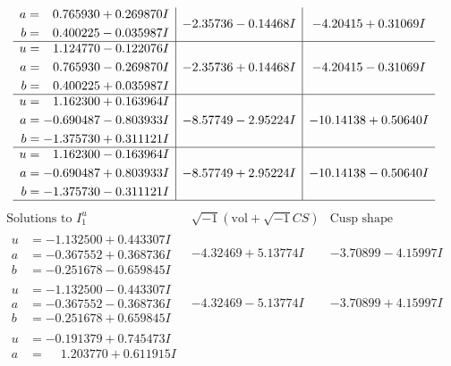\documentclass[1p]{elsarticle_modified}
\theoremstyle{definition}
\newcommand{\I}{\sqrt{-1}}
\begin{document}
$$\begin{array}{c|c|c}
\begin{aligned}
a &= \phantom{-}0.765930 + 0.269870 I \\
b &= \phantom{-}0.400225 - 0.035987 I\end{aligned}
 & -2.35736 - 0.14468 I & -4.20415 + 0.31069 I \\ \hline\begin{aligned}
u &= \phantom{-}1.124770 - 0.122076 I \\
a &= \phantom{-}0.765930 - 0.269870 I \\
b &= \phantom{-}0.400225 + 0.035987 I\end{aligned}
 & -2.35736 + 0.14468 I & -4.20415 - 0.31069 I \\ \hline\begin{aligned}
u &= \phantom{-}1.162300 + 0.163964 I \\
a &= -0.690487 - 0.803933 I \\
b &= -1.375730 + 0.311121 I\end{aligned}
 & -8.57749 - 2.95224 I & -10.14138 + 0.50640 I \\ \hline\begin{aligned}
u &= \phantom{-}1.162300 - 0.163964 I \\
a &= -0.690487 + 0.803933 I \\
b &= -1.375730 - 0.311121 I\end{aligned}
 & -8.57749 + 2.95224 I & -10.14138 - 0.50640 I\\
 \hline 
 \end{array}$$\newpage$$\begin{array}{c|c|c}  
\text{Solutions to }I^u_{1}& \I (\text{vol} + \sqrt{-1}CS) & \text{Cusp shape}\\
 \hline 
\begin{aligned}
u &= -1.132500 + 0.443307 I \\
a &= -0.367552 + 0.368736 I \\
b &= -0.251678 - 0.659845 I\end{aligned}
 & -4.32469 + 5.13774 I & -3.70899 - 4.15997 I \\ \hline\begin{aligned}
u &= -1.132500 - 0.443307 I \\
a &= -0.367552 - 0.368736 I \\
b &= -0.251678 + 0.659845 I\end{aligned}
 & -4.32469 - 5.13774 I & -3.70899 + 4.15997 I \\ \hline\begin{aligned}
u &= -0.191379 + 0.745473 I \\
a &= \phantom{-}1.203770 + 0.611915 I \\

\end{aligned}
\end{array}$$
\end{document}

